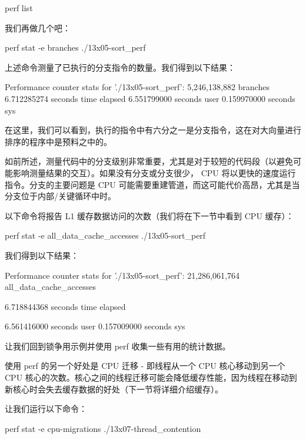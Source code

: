 \begin{shell}
perf list
\end{shell}

我们再做几个吧：

\begin{shell}
perf stat -e branches ./13x05-sort_perf
\end{shell}

上述命令测量了已执行的分支指令的数量。我们得到以下结果：

\begin{shell}
Performance counter stats for './13x05-sort_perf':
    5,246,138,882      branches
     6.712285274 seconds time elapsed
     6.551799000 seconds user
     0.159970000 seconds sys
\end{shell}

在这里，我们可以看到，执行的指令中有六分之一是分支指令，这在对大向量进行排序的程序中是预料之中的。

如前所述，测量代码中的分支级别非常重要，尤其是对于较短的代码段（以避免可能影响测量结果的交互）。如果没有分支或分支很少， CPU 将以更快的速度运行指令。分支的主要问题是 CPU 可能需要重建管道，而这可能代价高昂，尤其是当分支位于内部/关键循环中时。

以下命令将报告 L1 缓存数据访问的次数（我们将在下一节中看到 CPU 缓存）：

\begin{shell}
perf stat -e all_data_cache_accesses ./13x05-sort_perf
\end{shell}

我们得到以下结果：

\begin{shell}
Performance counter stats for './13x05-sort_perf':
    21,286,061,764      all_data_cache_accesses

       6.718844368 seconds time elapsed

       6.561416000 seconds user
       0.157009000 seconds sys
\end{shell}

让我们回到锁争用示例并使用 perf 收集一些有用的统计数据。

使用 perf 的另一个好处是 CPU 迁移 - 即线程从一个 CPU 核心移动到另一个 CPU 核心的次数。核心之间的线程迁移可能会降低缓存性能，因为线程在移动到新核心时会失去缓存数据的好处（下一节将详细介绍缓存）。

让我们运行以下命令：

\begin{shell}
perf stat -e cpu-migrations ./13x07-thread_contention
\end{shell}

